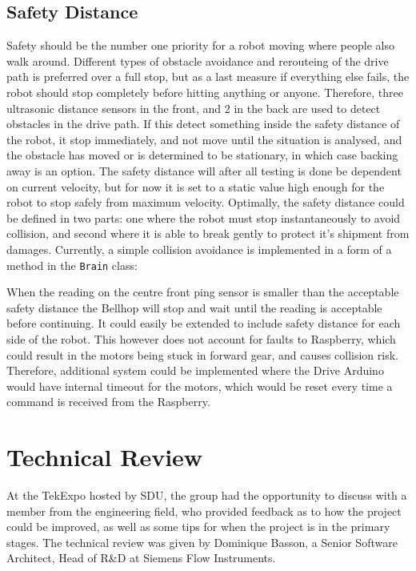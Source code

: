 \documentclass[11pt]{article}
\begin{document}
\subsection*{Safety Distance}
Safety should be the number one priority for a robot moving where people also walk around. Different types of obstacle avoidance and rerouteing of the drive path is preferred over a full stop, but as a last measure if everything else fails, the robot should stop completely before hitting anything or anyone. Therefore, three ultrasonic distance sensors in the front, and 2 in the back are used to detect obstacles in the drive path. If this detect something inside the safety distance of the robot, it stop immediately, and not move until the situation is analysed, and the obstacle has moved or is determined to be stationary, in which case backing away is an option. The safety distance will after all testing is done be dependent on current velocity, but for now it is set to a static value high enough for the robot to stop safely from maximum velocity. 
Optimally, the safety distance could be defined in two parts: one where the robot must stop instantaneously to avoid collision, and second where it is able to break gently to protect it's shipment from damages.
\goodbreak
Currently, a simple collision avoidance is implemented in a form of a method in the \texttt{Brain} class:

When the reading on the centre front ping sensor is smaller than the acceptable safety distance the Bellhop will stop and wait until the reading is acceptable before continuing. It could easily be extended to include safety distance for each side of the robot. This however does not account for faults to Raspberry, which could result in the motors being stuck in forward gear, and causes collision risk. Therefore, additional system could be implemented where the Drive Arduino would have internal timeout for the motors, which would be reset every time a command is received from the Raspberry.

\newpage
\section{Technical Review}
At the TekExpo hosted by SDU, the group had the opportunity to discuss with a member from the engineering field, who provided feedback as to how the project could be improved, as well as some tips for when the project is in the primary stages.
The technical review was given by Dominique Basson, a Senior Software Architect, Head of R\&D at Siemens Flow Instruments.
\end{document}

